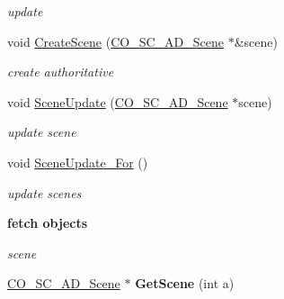 \begin{DoxyCompactItemize}
\begin{DoxyCompactList}\small\item\em update \item\end{DoxyCompactList}\item 
\hypertarget{classContent_1_1Universe_1_1Admin_1_1Universe_ad8ad4987af70caf10f6719a32cb88f01}{
void \hyperlink{classContent_1_1Universe_1_1Admin_1_1Universe_ad8ad4987af70caf10f6719a32cb88f01}{CreateScene} (\hyperlink{classContent_1_1CO__SC__AD__Scene}{CO\_\-SC\_\-AD\_\-Scene} $\ast$\&scene)}
\label{classContent_1_1Universe_1_1Admin_1_1Universe_ad8ad4987af70caf10f6719a32cb88f01}

\begin{DoxyCompactList}\small\item\em create authoritative \item\end{DoxyCompactList}\item 
\hypertarget{classContent_1_1Universe_1_1Admin_1_1Universe_aee29e4512dc57ddbaee0bbb2be92cbbb}{
void \hyperlink{classContent_1_1Universe_1_1Admin_1_1Universe_aee29e4512dc57ddbaee0bbb2be92cbbb}{SceneUpdate} (\hyperlink{classContent_1_1CO__SC__AD__Scene}{CO\_\-SC\_\-AD\_\-Scene} $\ast$scene)}
\label{classContent_1_1Universe_1_1Admin_1_1Universe_aee29e4512dc57ddbaee0bbb2be92cbbb}

\begin{DoxyCompactList}\small\item\em update scene \item\end{DoxyCompactList}\item 
\hypertarget{classContent_1_1Universe_1_1Admin_1_1Universe_a288575c0fb5dd845c9963015515141a3}{
void \hyperlink{classContent_1_1Universe_1_1Admin_1_1Universe_a288575c0fb5dd845c9963015515141a3}{SceneUpdate\_\-For} ()}
\label{classContent_1_1Universe_1_1Admin_1_1Universe_a288575c0fb5dd845c9963015515141a3}

\begin{DoxyCompactList}\small\item\em update scenes \item\end{DoxyCompactList}\end{DoxyCompactItemize}
\begin{Indent}{\bf fetch objects}\par
{\em \label{_amgrpb712734d7b6a37d417e36727149b52a3}
 scene }\begin{DoxyCompactItemize}
\item 
\hypertarget{classContent_1_1Universe_1_1Admin_1_1Universe_a63a3e3be7bf48626dba47655e81270b1}{
\hyperlink{classContent_1_1CO__SC__AD__Scene}{CO\_\-SC\_\-AD\_\-Scene} $\ast$ {\bfseries GetScene} (int a)}
\label{classContent_1_1Universe_1_1Admin_1_1Universe_a63a3e3be7bf48626dba47655e81270b1}

\end{DoxyCompactItemize}
\end{Indent}
